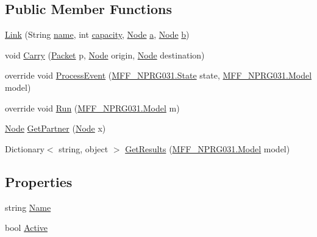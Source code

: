 \subsection*{Public Member Functions}
\begin{DoxyCompactItemize}
\item 
\hyperlink{classNetTrafficSimulator_1_1Link_a83847c253f988b59e7224d665901449b}{Link} (String \hyperlink{classNetTrafficSimulator_1_1Link_af5a2835b585c255fbc6584f2f5388be8}{name}, int \hyperlink{classNetTrafficSimulator_1_1Link_a24a004105c985c4e5ee64e4c839b1915}{capacity}, \hyperlink{classNetTrafficSimulator_1_1Node}{Node} \hyperlink{classNetTrafficSimulator_1_1Link_a4b7875d945423d1f64c31d8156a3308d}{a}, \hyperlink{classNetTrafficSimulator_1_1Node}{Node} \hyperlink{classNetTrafficSimulator_1_1Link_af85461b8b8d35adb1d8fc80849c0717d}{b})
\item 
void \hyperlink{classNetTrafficSimulator_1_1Link_a51bfc5e94e05941d8302c5552e36f1a3}{Carry} (\hyperlink{classNetTrafficSimulator_1_1Packet}{Packet} p, \hyperlink{classNetTrafficSimulator_1_1Node}{Node} origin, \hyperlink{classNetTrafficSimulator_1_1Node}{Node} destination)
\item 
override void \hyperlink{classNetTrafficSimulator_1_1Link_a953900c6d1064af45c99b9533eadeafe}{Process\-Event} (\hyperlink{classMFF__NPRG031_1_1State}{M\-F\-F\-\_\-\-N\-P\-R\-G031.\-State} state, \hyperlink{classMFF__NPRG031_1_1Model}{M\-F\-F\-\_\-\-N\-P\-R\-G031.\-Model} model)
\item 
override void \hyperlink{classNetTrafficSimulator_1_1Link_a654d0221ce7490d08ad40a70887b80c8}{Run} (\hyperlink{classMFF__NPRG031_1_1Model}{M\-F\-F\-\_\-\-N\-P\-R\-G031.\-Model} m)
\item 
\hyperlink{classNetTrafficSimulator_1_1Node}{Node} \hyperlink{classNetTrafficSimulator_1_1Link_a45cd71692f0fc8b76d4ae5f53d14580a}{Get\-Partner} (\hyperlink{classNetTrafficSimulator_1_1Node}{Node} x)
\item 
Dictionary$<$ string, object $>$ \hyperlink{classNetTrafficSimulator_1_1Link_aa0d6e4b0e7f61acda461b4d1eab0f1fd}{Get\-Results} (\hyperlink{classMFF__NPRG031_1_1Model}{M\-F\-F\-\_\-\-N\-P\-R\-G031.\-Model} model)
\end{DoxyCompactItemize}
\subsection*{Properties}
\begin{DoxyCompactItemize}
\item 
string \hyperlink{classNetTrafficSimulator_1_1Link_ac6510bbaac975c237d4dab9b492b5cfe}{Name}
\item 
bool \hyperlink{classNetTrafficSimulator_1_1Link_af5dbc33cd8e78697ce401ad2520877e8}{Active}
\end{DoxyCompactItemize}
